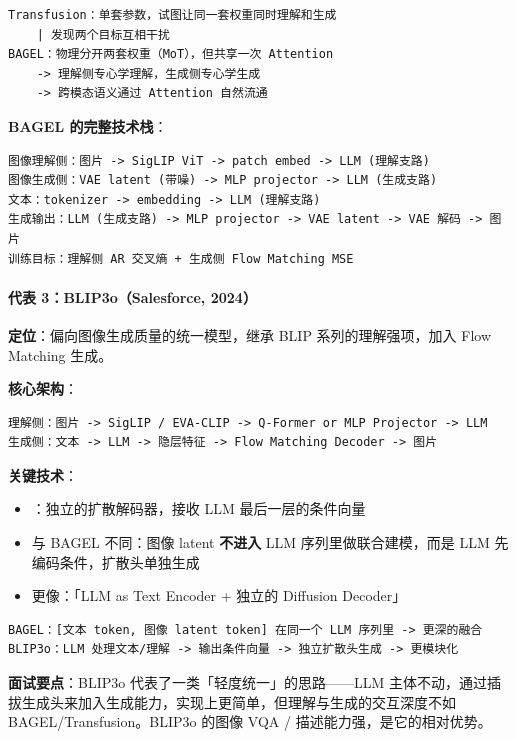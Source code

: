 \begin{lstlisting}
Transfusion：单套参数，试图让同一套权重同时理解和生成
    | 发现两个目标互相干扰
BAGEL：物理分开两套权重（MoT），但共享一次 Attention
    -> 理解侧专心学理解，生成侧专心学生成
    -> 跨模态语义通过 Attention 自然流通
\end{lstlisting}

\textbf{BAGEL 的完整技术栈}：
\begin{lstlisting}
图像理解侧：图片 -> SigLIP ViT -> patch embed -> LLM (理解支路)
图像生成侧：VAE latent (带噪) -> MLP projector -> LLM (生成支路)
文本：tokenizer -> embedding -> LLM (理解支路)
生成输出：LLM (生成支路) -> MLP projector -> VAE latent -> VAE 解码 -> 图片
训练目标：理解侧 AR 交叉熵 + 生成侧 Flow Matching MSE
\end{lstlisting}

\paragraph{代表 3：BLIP3o（Salesforce, 2024）}

\textbf{定位}：偏向图像生成质量的统一模型，继承 BLIP 系列的理解强项，加入 Flow Matching 生成。

\textbf{核心架构}：
\begin{lstlisting}
理解侧：图片 -> SigLIP / EVA-CLIP -> Q-Former or MLP Projector -> LLM
生成侧：文本 -> LLM -> 隐层特征 -> Flow Matching Decoder -> 图片
\end{lstlisting}

\textbf{关键技术}：
\begin{itemize}
  \item {}：独立的扩散解码器，接收 LLM 最后一层的条件向量
  \item 与 BAGEL 不同：图像 latent \textbf{不进入} LLM 序列里做联合建模，而是 LLM 先编码条件，扩散头单独生成
  \item 更像：「LLM as Text Encoder + 独立的 Diffusion Decoder」
\end{itemize}

\begin{lstlisting}
BAGEL：[文本 token, 图像 latent token] 在同一个 LLM 序列里 -> 更深的融合
BLIP3o：LLM 处理文本/理解 -> 输出条件向量 -> 独立扩散头生成 -> 更模块化
\end{lstlisting}

\begin{summarybox}
\textbf{面试要点}：BLIP3o 代表了一类「轻度统一」的思路——LLM 主体不动，通过插拔生成头来加入生成能力，实现上更简单，但理解与生成的交互深度不如 BAGEL/Transfusion。BLIP3o 的图像 VQA / 描述能力强，是它的相对优势。
\end{summarybox}

